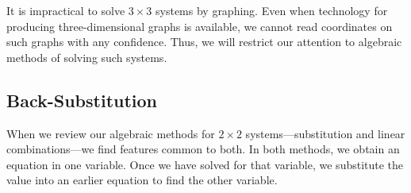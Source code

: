 \documentclass[10pt,]{book}
\theoremstyle{plain}
\theoremstyle{definition}
\theoremstyle{definition}
\theoremstyle{definition}
\theoremstyle{definition}
\numberwithin{equation}{section}
\begin{document}
	It is impractical to solve \(3\times 3\) systems by graphing. Even when technology for producing three-dimensional graphs is available, we cannot read coordinates on such graphs with any confidence. Thus, we will restrict our attention to algebraic methods of solving such systems.
%
\typeout{************************************************}
\typeout{************************************************}
\subsection[Back-Substitution]{Back-Substitution}\label{subsection-6}

	When we review our algebraic methods for \(2\times 2\) systems—substitution and linear combinations—we find features common to both. In both methods, we obtain an equation in one variable. Once we have solved for that variable, we substitute the value into an earlier equation to find the other variable.
%
\par
\end{document}
